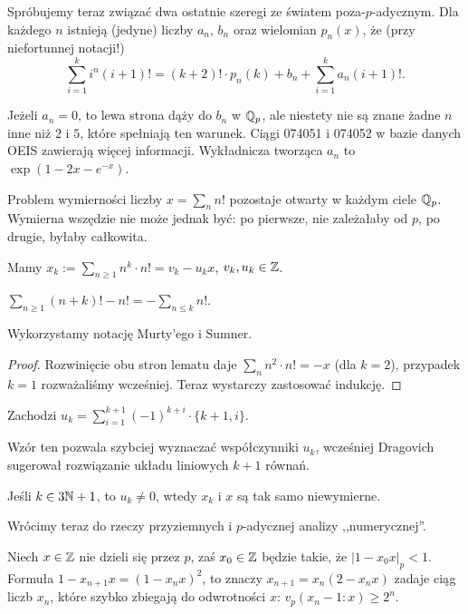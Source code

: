 Spróbujemy teraz związać dwa ostatnie szeregi ze światem poza-$p$-adycznym.
Dla każdego $n$ istnieją (jedyne) liczby $a_n$, $b_n$ oraz wielomian $p_n(x)$, że (przy niefortunnej notacji!)
\[
	\sum_{i = 1}^k i^n (i+1)! = (k+2)! \cdot p_n(k) + b_n + \sum_{i = 1}^k a_n (i+1)!.
\]

Jeżeli $a_n = 0$, to lewa strona dąży do $b_n$ w $\mathbb Q_p$, ale niestety nie są znane żadne $n$ inne niż $2$ i $5$, które spełniają ten warunek.
Ciągi 074051 i 074052 w bazie danych OEIS zawierają więcej informacji.
Wykładnicza tworząca $a_n$ to $\exp(1-2x-e^{-x})$.

Problem wymierności liczby $x = \sum_n n!$ pozostaje otwarty w każdym ciele $\mathbb Q_p$.
Wymierna wszędzie nie może jednak być: po pierwsze, nie zależałaby od $p$, po drugie, byłaby całkowita.

\begin{fakt}
	Mamy $x_k := \sum_{n \ge 1} n^k \cdot n! = v_k - u_k x$, $v_k, u_k \in \mathbb Z$.
\end{fakt}

\begin{lemat}
	$\sum_{n \ge 1} (n+k)! - n! = - \sum_{n\le k} n!$.
\end{lemat}

Wykorzystamy notację Murty'ego i Sumner.

\begin{proof}
Rozwinięcie obu stron lematu daje $\sum_n n^2 \cdot n! = -x$ (dla $k = 2$), przypadek $k = 1$ rozważaliśmy wcześniej.
Teraz wystarczy zastosować indukcję.
\end{proof}

\begin{fakt}
	Zachodzi $u_k = \sum_{i=1}^{k+1} (-1)^{k+i} \cdot \{k+1, i\}$.
\end{fakt}

Wzór ten pozwala szybciej wyznaczać współczynniki $u_k$, wcześniej Dragovich sugerował rozwiązanie układu liniowych $k+1$ równań.

\begin{fakt}
	Jeśli $k \in 3\mathbb N + 1$, to $u_k \neq 0$, wtedy $x_k$ i $x$ są tak samo niewymierne.
\end{fakt}

Wrócimy teraz do rzeczy przyziemnych i $p$-adycznej analizy ,,numerycznej''.

\begin{fakt}
	Niech $x \in \mathbb Z$ nie dzieli się przez $p$, zaś $x_0 \in \mathbb Z$ będzie takie, że $|1 - x_0x|_p < 1$.
	Formuła $1 - x_{n+1} x = (1 - x_n x)^2$, to znaczy $x_{n+1} = x_n (2 - x_nx)$ zadaje ciąg liczb $x_n$, które szybko zbiegają do odwrotności $x$: $v_p(x_n - 1 : x) \ge 2^n$.
\end{fakt}
